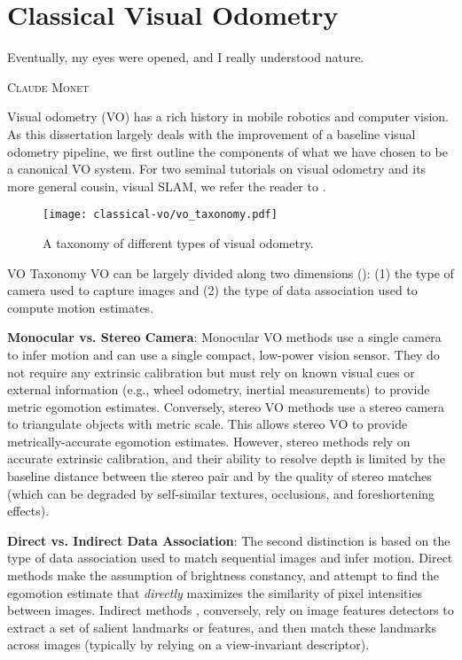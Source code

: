 \chapter{Classical Visual Odometry}
\label{ch:vo}
\epigraph{Eventually, my eyes were opened, and I really understood nature.}{\textsc{Claude Monet}}

Visual odometry (VO) has a rich history in mobile robotics and computer vision. As this dissertation largely deals with the improvement of a baseline visual odometry pipeline, we first outline the components of what we have chosen to be a canonical VO system. For two seminal tutorials on visual odometry and its more general cousin, visual SLAM, we refer the reader to \cite{Scaramuzza2011-qr,Cadena2016-ds}.

\begin{figure}[h!]
\begin{center}
		\texttt{[image: classical-vo/vo\_taxonomy.pdf]}
		\caption{A taxonomy of different types of visual odometry.}
  	\label{fig:vo_taxonomy}
\end{center}
\end{figure}

\newpage
\begin{remark}{VO Taxonomy}
VO can be largely divided along two dimensions (): (1) the type of camera used to capture images and (2) the type of data association used to compute motion estimates. 

\textbf{Monocular vs. Stereo Camera}:
 Monocular VO methods \citep{engel_direct_2018,Tsotsos2015} use a single camera to infer motion and can use a single compact, low-power vision sensor. They do not require any extrinsic calibration but must rely on known visual cues or external information (e.g., wheel odometry, inertial measurements) to provide metric egomotion estimates. Conversely, stereo VO methods \citep{engel_direct_2018, Leutenegger2015-fk, Cvisic2015-mt} use a stereo camera to triangulate objects with metric scale. This allows stereo VO to provide metrically-accurate egomotion estimates. However, stereo methods rely on accurate extrinsic calibration, and their ability to resolve depth is limited by the baseline distance between the stereo pair and by the quality of stereo matches (which can be degraded by self-similar textures, occlusions, and foreshortening effects). 

\textbf{Direct vs. Indirect Data Association}:
The second distinction is based on the type of data association used to match sequential images and infer motion. Direct methods \citep{engel_direct_2018,wang_stereo_2017} make the assumption of brightness constancy, and attempt to find the egomotion estimate that \textit{directly} maximizes the similarity of pixel intensities between images. Indirect methods \citep{Leutenegger2015-fk,Cvisic2015-mt}, conversely, rely on image features detectors to extract a set of salient landmarks or features, and then match these landmarks across images (typically by relying on a view-invariant descriptor).	
\end{remark}



